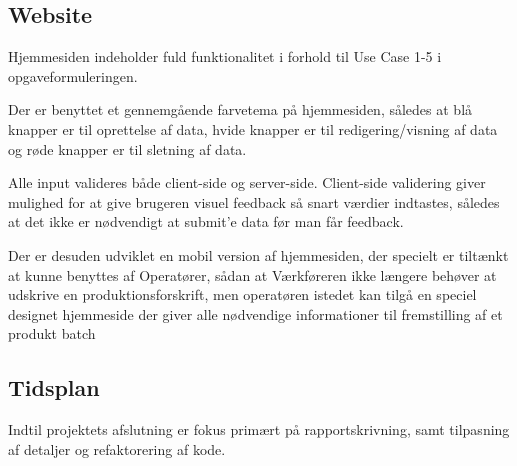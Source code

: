\documentclass[a4paper]{article}
\begin{document}

\subsection{Website} %

Hjemmesiden indeholder fuld funktionalitet i forhold til Use Case 1-5 i opgaveformuleringen.

Der er benyttet et gennemgående farvetema på hjemmesiden, således at blå knapper er til oprettelse af data, hvide knapper er til redigering/visning af data og røde knapper er til sletning af data.

Alle input valideres både client-side og server-side. Client-side validering giver mulighed for at give brugeren visuel feedback så snart værdier indtastes, således at det ikke er nødvendigt at submit'e data før man får feedback.

Der er desuden udviklet en mobil version af hjemmesiden, der specielt er tiltænkt at kunne benyttes af Operatører, sådan at Værkføreren ikke længere behøver at udskrive en produktionsforskrift, men operatøren istedet kan tilgå en speciel designet hjemmeside der giver alle nødvendige informationer til fremstilling af et produkt batch


\subsection{Tidsplan} %

Indtil projektets afslutning er fokus primært på rapportskrivning, samt tilpasning af detaljer og refaktorering af kode.


\end{document}
